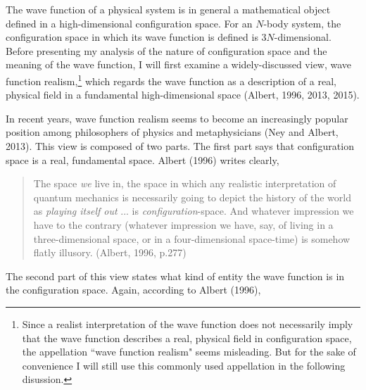 

The wave function of a physical system is in general a mathematical object defined in a high-dimensional configuration space. For an $N$-body system, the configuration space in which its wave function is defined is $3N$-dimensional. 
Before presenting my analysis of the nature of configuration space and the meaning of the wave function, I will first examine a widely-discussed view, wave function realism,\footnote{Since a realist interpretation of the wave function does not necessarily imply that the wave function describes a real, physical field in configuration space, the appellation ``wave function realism" seems misleading. But for the sake of convenience I will still use this commonly used appellation in the following disussion.} which regards the wave function as a description of a real, physical field in a fundamental high-dimensional space (Albert, 1996, 2013, 2015).

In recent years, wave function realism seems to become an increasingly popular position among philosophers of physics and metaphysicians (Ney and Albert, 2013). This view is composed of two parts. The first part says that configuration space is a real, fundamental space. Albert (1996) writes clearly,

\begin{quote}
The space \emph{we} live in, the space in which any realistic interpretation of quantum mechanics is necessarily going to depict the history of the world as \emph{playing itself out} ... is \emph{configuration}-space. And whatever impression we have to the contrary (whatever impression we have, say, of living in a three-dimensional space, or in a four-dimensional space-time) is somehow flatly illusory. (Albert, 1996, p.277)
\end{quote}

\noindent The second part of this view states what kind of entity the wave function is in the configuration space. Again, according to Albert (1996),


